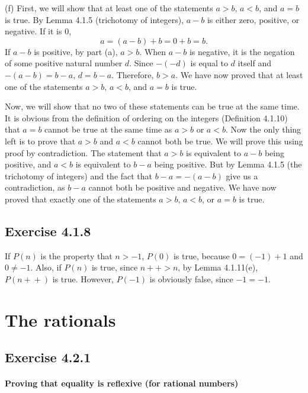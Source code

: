 \documentclass[12pt, oneside]{book}
\newcommand{\increment}{\! + \! +}
\begin{document}
	\bigskip
	\noindent (f) First, we will show that at least one of the statements $a > b$, $a < b$, and $a = b$ is true. By Lemma 4.1.5 (trichotomy of integers), $a - b$ is either zero, positive, or negative. If it is $0$, \[a = (a - b) + b = 0 + b = b.\] If $a - b$ is positive, by part (a), $a > b$. When $a - b$ is negative, it is the negation of some positive natural number $d$. Since $-(-d)$ is equal to $d$ itself and $-(a - b) = b - a$, $d = b - a$. Therefore, $b > a$. We have now proved that at least one of the statements $a > b$, $a < b$, and $a = b$ is true.

	Now, we will show that no two of these statements can be true at the same time. It is obvious from the definition of ordering on the integers (Definition 4.1.10) that $a = b$ cannot be true at the same time as $a > b$ or $a < b$. Now the only thing left is to prove that $a > b$ and $a < b$ cannot both be true. We will prove this using proof by contradiction. The statement that $a > b$ is equivalent to $a - b$ being positive, and $a < b$ is equivalent to $b - a$ being positive. But by Lemma 4.1.5 (the trichotomy of integers) and the fact that $b - a = -(a - b)$ give us a contradiction, as $b - a$ cannot both be positive and negative. We have now proved that exactly one of the statements $a > b$, $a < b$, or $a = b$ is true.

	\subsection*{Exercise 4.1.8}

	If $P(n)$ is the property that $n > -1$, $P(0)$ is true, because $0 = (-1) + 1$ and $0 \ne -1$. Also, if $P(n)$ is true, since $n \increment > n$, by Lemma 4.1.11(e), $P(n \increment)$ is true. However, $P(-1)$ is obviously false, since $-1 = -1$.

	\section{The rationals}

	\subsection*{Exercise 4.2.1}

	\paragraph*{Proving that equality is reflexive (for rational numbers)}
\end{document}
